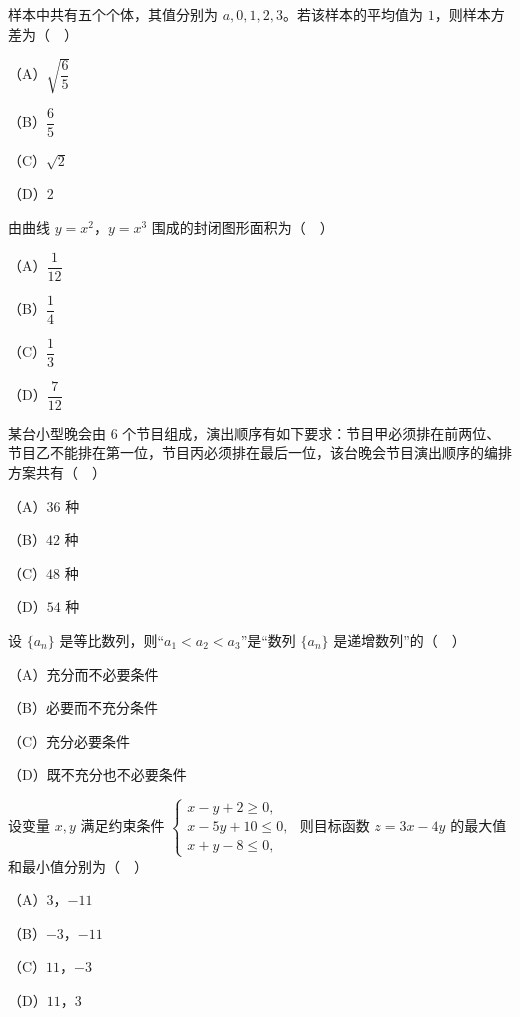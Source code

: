 \begin{question}
样本中共有五个个体，其值分别为 $a,0,1,2,3$。若该样本的平均值为 $1$，则样本方差为（　）

（A）$\sqrt{\dfrac65}$

（B）$\dfrac65$

（C）$\sqrt2$

（D）$2$

\end{question}
\begin{question}
由曲线 $y=x^2$，$y=x^3$ 围成的封闭图形面积为（　）

（A）$\dfrac1{12}$

（B）$\dfrac14$

（C）$\dfrac13$

（D）$\dfrac7{12}$

\end{question}
\begin{question}
某台小型晚会由 $6$ 个节目组成，演出顺序有如下要求：节目甲必须排在前两位、节目乙不能排在第一位，节目丙必须排在最后一位，该台晚会节目演出顺序的编排方案共有（　）

（A）$36$ 种

（B）$42$ 种

（C）$48$ 种

（D）$54$ 种

\end{question}
\begin{question}
设 $\{a_n\}$ 是等比数列，则“$a_1<a_2<a_3$”是“数列 $\{a_n\}$ 是递增数列”的（　）

（A）充分而不必要条件

（B）必要而不充分条件

（C）充分必要条件

（D）既不充分也不必要条件

\end{question}
\begin{question}
设变量 $x,y$ 满足约束条件 $\begin{cases}x-y+2\geqslant0,\\ x-5y+10\leqslant0,\\ x+y-8\leqslant0,\end{cases}$ 则目标函数 $z=3x-4y$ 的最大值和最小值分别为（　）

（A）$3$，$-11$

（B）$-3$，$-11$

（C）$11$，$-3$

（D）$11$，$3$

\Needspace{0.4\textheight}
\end{question}
